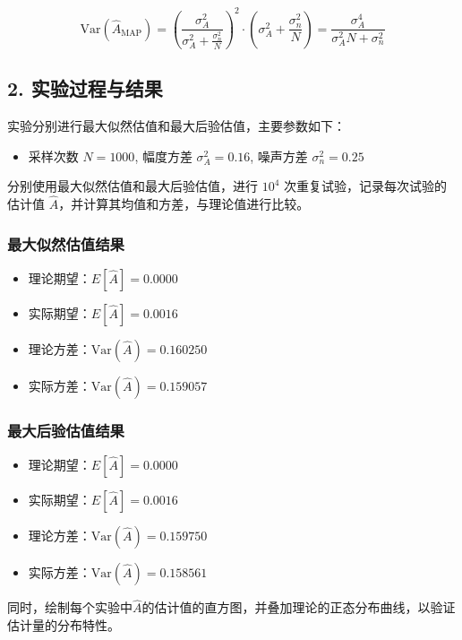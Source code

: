 \documentclass[12pt]{ctexart}
\begin{document}
\[
\text{Var}(\hat{A}_{\text{MAP}}) = \left( \frac{\sigma_A^2}{\sigma_A^2 + \frac{\sigma_n^2}{N}} \right)^2 \cdot \left( \sigma_A^2 + \frac{\sigma_n^2}{N} \right) = \frac{\sigma_A^4}{\sigma_A^2 N + \sigma_n^2}
\]

\subsection*{2. 实验过程与结果}

实验分别进行最大似然估值和最大后验估值，主要参数如下：

\begin{itemize}
    \item 采样次数 \( N = 1000 \), 幅度方差 \( \sigma_A^2 = 0.16 \), 噪声方差 \( \sigma_n^2 = 0.25 \)
\end{itemize}

分别使用最大似然估值和最大后验估值，进行 \( 10^4 \) 次重复试验，记录每次试验的估计值 \( \hat{A} \)，并计算其均值和方差，与理论值进行比较。

\subsubsection*{最大似然估值结果}

\begin{itemize}
    \item 理论期望：\( E[\hat{A}] = 0.0000 \)
    \item 实际期望：\( E[\hat{A}] = 0.0016 \)
    \item 理论方差：\( \text{Var}(\hat{A}) = 0.160250 \)
    \item 实际方差：\( \text{Var}(\hat{A}) = 0.159057 \)
\end{itemize}

\subsubsection*{最大后验估值结果}

\begin{itemize}
    \item 理论期望：\( E[\hat{A}] = 0.0000 \)
    \item 实际期望：\( E[\hat{A}] = 0.0016 \)
    \item 理论方差：\( \text{Var}(\hat{A}) = 0.159750 \)
    \item 实际方差：\( \text{Var}(\hat{A}) = 0.158561 \)
\end{itemize}

同时，绘制每个实验中$\hat A$的估计值的直方图，并叠加理论的正态分布曲线，以验证估计量的分布特性。
\end{document}
